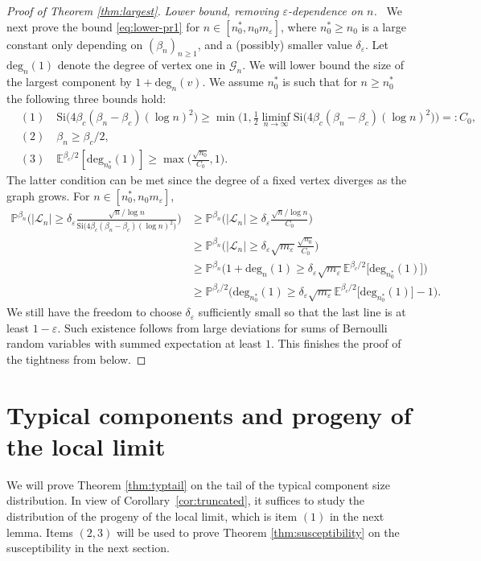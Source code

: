 \documentclass[a4paper, a4wide, 10pt, reqno]{amsart}
\theoremstyle{plain}
\theoremstyle{definition}
\numberwithin{equation}{section}
\newcommand{\E}{\mathbb E}
\newcommand{\Prob}{\mathbb{P}}
\newcommand\eps{\varepsilon}
\newcommand{\sG}{{\mathscr G}}
\newcommand{\sL}{{\mathscr L}}
\newcommand{\Si}{{\mathrm{Si}}}
\begin{document}
\begin{proof}[Proof of Theorem \ref{thm:largest}]
\pagebreak[3]
\noindent\emph{Lower bound, removing $\eps$-dependence on $n$.\ } We next prove the bound \eqref{eq:lower-pr1} for $n\in[n_0^*,n_0m_\varepsilon]$, where $n_0^*\ge n_0$ is a large constant only depending on $(\beta_n)_{n\ge1}$, and a (possibly) smaller value $\delta_\varepsilon$. Let $\mathrm{deg}_n(1)$ denote the degree of vertex one in $\sG_n$. We will lower bound the size of the largest component by $1+\mathrm{deg}_n(v)$. 
We assume $n_0^*$ is such that for $n\ge n_0^*$ the following three bounds hold:
\[
\begin{aligned}
&(1)\quad \Si\big(4\beta_c(\beta_n-\beta_c)(\log n)^2\big)\ge \min\bigg(1,\frac12 \liminf_{n\to\infty}\Si\big(4\beta_c(\beta_n-\beta_c)(\log n)^2\big)\bigg)=:C_0, \\
&(2)\quad \beta_n\ge \beta_c/2, \\
&(3)\quad \E^{\beta_c/2}[\mathrm{deg}_{n_0^*}(1)]\ge \max\Big(\frac{\sqrt{n_0}}{C_0},1\Big).
\end{aligned}
\]
The latter condition can be met since the degree of a fixed vertex diverges as the graph grows. For $n\in[n_0^*, n_0m_\varepsilon]$,
\begin{align}
    \Prob^{\beta_n}\bigg(|\sL_n|\ge \delta_\varepsilon \frac{\sqrt{n}/\log n}{\Si\big(4\beta_c(\beta_n-\beta_c)(\log n)^2\big)}\bigg) &\ge \Prob^{\beta_n}\bigg(|\sL_n|\ge \delta_\varepsilon \frac{\sqrt{n}/\log n}  {C_0}\bigg) \nonumber\\
    &\ge \Prob^{\beta_n}\bigg(|\sL_n|\ge \delta_\varepsilon \sqrt{m_\varepsilon} \frac{\sqrt{n_0}} {C_0}\bigg) \nonumber\\
    &\ge \Prob^{\beta_n}\Big(1+\mathrm{deg}_n(1) \ge \delta_\varepsilon \sqrt{m_\varepsilon}\E^{\beta_c/2}\big[\mathrm{deg}_{n_0^\ast}(1)\big] \Big)\nonumber \\
    &\ge \Prob^{\beta_c/2}\Big(\mathrm{deg}_{n_0^*}(1) \ge \delta_\varepsilon \sqrt{m_\varepsilon}\E^{\beta_c/2}\big[\mathrm{deg}_{n_0^\ast}(1)\big] -1 \Big).\nonumber 
    \end{align}
    We still have the freedom to choose $\delta_\varepsilon$ sufficiently small so that the last line is at least $1-\varepsilon$. Such existence follows from large deviations for sums of Bernoulli random variables with summed expectation at least $1$. This finishes the proof of the tightness from below.
    \end{proof}


\section{Typical components and progeny of the local limit}\label{sec:progeny-local}
 We will prove Theorem \ref{thm:typtail} on  the tail of the typical component size distribution. In view of Corollary~\ref{cor:truncated}, it suffices to study the distribution of the progeny of the local limit, which is item $(1)$ in the next lemma. Items $(2, 3)$ will be used to prove Theorem \ref{thm:susceptibility} on the susceptibility in the next section.
\end{document}
